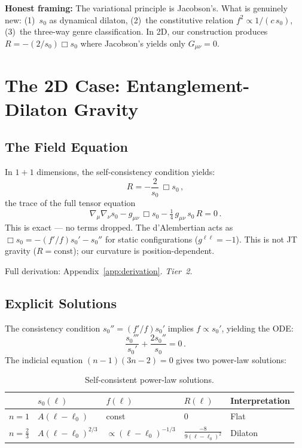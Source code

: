 \documentclass[aps,prd,twocolumn,superscriptaddress,nofootinbib,floatfix]{revtex4-2}
\newcommand{\sn}{s_0}
\newcommand{\dAlem}{\Box}
\begin{document}
\textbf{Honest framing:} The variational principle is Jacobson's. What is genuinely new: (1)~$\sn$ as dynamical dilaton, (2)~the constitutive relation $f^2 \propto 1/(c\,\sn)$, (3)~the three-way genre classification. In 2D, our construction produces $R = -(2/\sn)\dAlem\sn$ where Jacobson's yields only $G_{\mu\nu} = 0$.

\section{The 2D Case: Entanglement-Dilaton Gravity}
\label{sec:2D}

\subsection{The Field Equation}

In $1{+}1$ dimensions, the self-consistency condition yields:
\begin{equation}
\label{eq:fieldeq}
R = -\frac{2}{\sn}\,\dAlem\sn\,,
\end{equation}
the trace of the full tensor equation
\begin{equation}
\label{eq:tensoreq}
\nabla_\mu\nabla_\nu\sn - g_{\mu\nu}\,\dAlem\sn - \tfrac{1}{4}\,g_{\mu\nu}\,\sn\,R = 0\,.
\end{equation}
This is exact --- no terms dropped. The d'Alembertian acts as $\dAlem\sn = -(f'/f)\sn' - \sn''$ for static configurations ($g^{\ell\ell} = -1$). This is not JT gravity ($R = \text{const}$); our curvature is position-dependent.

Full derivation: Appendix~\ref{app:derivation}. \emph{Tier~2.}

\subsection{Explicit Solutions}

The consistency condition $\sn'' = (f'/f)\sn'$ implies $f \propto \sn'$, yielding the ODE:
\begin{equation}
\label{eq:ODE}
\frac{\sn'''}{\sn'} + \frac{2\sn''}{\sn} = 0\,.
\end{equation}
The indicial equation $(n-1)(3n-2) = 0$ gives two power-law solutions:

\begin{table}[ht!]
\centering
\begin{tabular}{@{}lllll@{}}
\toprule
& $\sn(\ell)$ & $f(\ell)$ & $R(\ell)$ & Interpretation \\
\midrule
$n{=}1$ & $A(\ell{-}\ell_0)$ & const & $0$ & Flat \\
$n{=}\frac{2}{3}$ & $A(\ell{-}\ell_0)^{2/3}$ & $\propto (\ell{-}\ell_0)^{-1/3}$ & $\frac{-8}{9(\ell{-}\ell_0)^2}$ & Dilaton \\
\bottomrule
\end{tabular}
\caption{Self-consistent power-law solutions.}
\label{tab:solutions}
\end{table}
\end{document}
